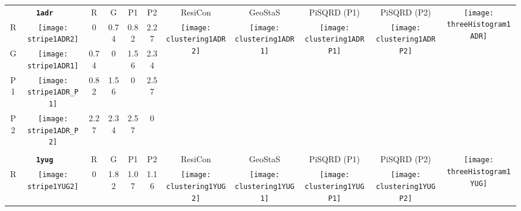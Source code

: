 \documentclass[a4paper,11pt,twoside]{book}%
\begin{document}
\begin{appendices}
\begin{sidewaystable}[h!]
\sffamily
\begin{tabular*}{4cm}{cc|c|c|c|c|c|c|c|c|c|}
\cline{1-11}
\multicolumn{2}{|c|}{{\bf \texttt{1adr}}} & R & G & P1 & P2 & ResiCon & GeoStaS & PiSQRD (P1) & PiSQRD (P2) & \multirow{5}{*}{\vspace{-0.15cm}\texttt{[image: threeHistogram1ADR]}}  \\
\cline{1-10}
\multicolumn{1}{|c|}{R} & \texttt{[image: stripe1ADR2]} & 0 & 0.74 & 0.82 & 2.27 & \multirow{4}{*}{\vspace{-0.3cm}\texttt{[image: clustering1ADR2]}} & \multirow{4}{*}{\vspace{-0.3cm}\texttt{[image: clustering1ADR1]}} & \multirow{4}{*}{\vspace{-0.3cm}\texttt{[image: clustering1ADRP1]}} & \multirow{4}{*}{\vspace{-0.3cm}\texttt{[image: clustering1ADRP2]}} &  \multirow{5}{*}{} \\
\cline{1-6}
\multicolumn{1}{|c|}{G} & \texttt{[image: stripe1ADR1]} & 0.74 & 0 & 1.56 & 2.34 & \multirow{4}{*}{} & \multirow{4}{*}{} & \multirow{4}{*}{} & \multirow{4}{*}{} & \multirow{5}{*}{} \\
\cline{1-6}
\multicolumn{1}{|c|}{P1} & \texttt{[image: stripe1ADR\_P1]} & 0.82 & 1.56 & 0 & 2.57 & \multirow{4}{*}{} & \multirow{4}{*}{} & \multirow{4}{*}{} & \multirow{4}{*}{} & \multirow{5}{*}{}  \\
\cline{1-6}
\multicolumn{1}{|c|}{P2} & \texttt{[image: stripe1ADR\_P2]} & 2.27 & 2.34 & 2.57 & 0 & \multirow{4}{*}{} & \multirow{4}{*}{} & \multirow{4}{*}{} & \multirow{4}{*}{} & \multirow{5}{*}{}  \\
\cline{1-11}
\\
\cline{1-11}
\multicolumn{2}{|c|}{{\bf \texttt{1yug}}} & R & G & P1 & P2 & ResiCon & GeoStaS & PiSQRD (P1) & PiSQRD (P2) & \multirow{5}{*}{\vspace{-0.15cm}\texttt{[image: threeHistogram1YUG]}}  \\
\cline{1-10}
\multicolumn{1}{|c|}{R} & \texttt{[image: stripe1YUG2]} & 0 & 1.82 & 1.07 & 1.16 & \multirow{4}{*}{\vspace{-0.3cm}\texttt{[image: clustering1YUG2]}} & \multirow{4}{*}{\vspace{-0.3cm}\texttt{[image: clustering1YUG1]}} & \multirow{4}{*}{\vspace{-0.3cm}\texttt{[image: clustering1YUGP1]}} & \multirow{4}{*}{\vspace{-0.3cm}\texttt{[image: clustering1YUGP2]}} &  \multirow{5}{*}{} \\

\end{tabular*}
\end{sidewaystable}
\end{appendices}
\end{document}
